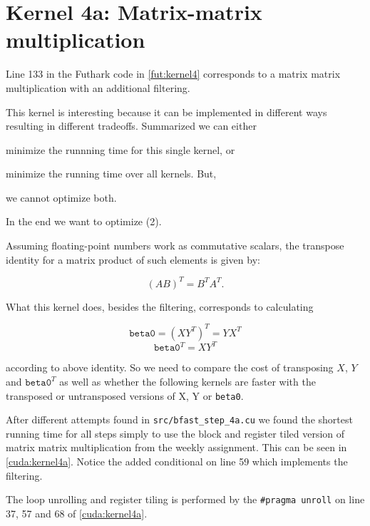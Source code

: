 \section{Kernel 4a:  Matrix-matrix multiplication}

\begin{figure}[H]
    \centering
    \caption{}
    \label{fut:kernel4}
\end{figure}


Line 133 in the Futhark code in \autoref{fut:kernel4} corresponds to a matrix
matrix multiplication with an additional filtering. 

This kernel is interesting because it can be implemented in different ways
resulting in different tradeoffs. Summarized we can either 

\begin{enumerate*}
    \item minimize the runnning time for this single kernel, or
    \item minimize the running time over all kernels. But,
    \item we cannot optimize both.
\end{enumerate*}

In the end we want to optimize (2).

Assuming floating-point numbers work as commutative scalars, the transpose
identity for a matrix product of such elements is given by:

\[ (AB)^T = B^T A^T. \]

What this kernel does, besides the filtering, corresponds to calculating

\[ \texttt{beta0} = (XY^T)^T = YX^T \]
\[ \texttt{beta0}^T = XY^T \]

according to above identity. So we need to compare the cost of transposing
\(X\), \(Y\) and \(\texttt{beta0}^T\) as well as whether the following kernels
are faster with the transposed or untransposed versions of X, Y or
\texttt{beta0}. 

After different attempts found in \texttt{src/bfast\_step\_4a.cu} we found the
shortest running time for all steps simply to use the block and register tiled
version of matrix matrix multiplication from the weekly assignment. This can be
seen in \autoref{cuda:kernel4a}. Notice the added conditional on line 59 which
implements the filtering.

The loop unrolling and register tiling is performed by the \texttt{\#pragma
unroll} on line 37, 57 and 68 of \autoref{cuda:kernel4a}.

